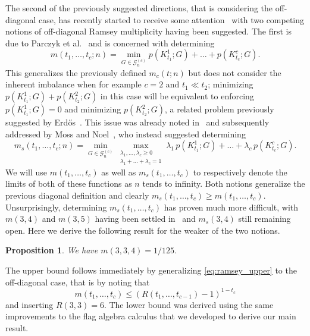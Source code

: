 \documentclass[a4paper,11pt]{article}
\newtheorem{proposition}[theorem]{Proposition}
\numberwithin{equation}{section}
\newcommand{\mG}{\mathcal{G}}
\begin{document}
The second of the previously suggested directions, that is considering the off-diagonal case, has recently started to receive some attention~\cite{ParczykEtAl_2022, behague2022common, moss2023off, Hyde2023} with two competing notions of off-diagonal Ramsey multiplicity having been suggested. The first is due to Parczyk et al.~\cite{ParczykEtAl_2022} and is concerned with determining 
%
\begin{equation*}
    m(t_1, \ldots, t_c; n) = \min_{G \in \mG_n^{(c)}} p(K_{t_1}^1; G) + \ldots + p(K_{t_c}^c; G).
\end{equation*}
%
This generalizes the previously defined $m_c(t; n)$ but does not consider the inherent imbalance when for example $c = 2$ and $t_1 \ll t_2$; minimizing $p(K_{t_1}^1; G) + p(K_{t_2}^2; G)$ in this case will be equivalent to enforcing $p(K_{t_1}^1; G) = 0$ and minimizing $p(K_{t_2}^2; G)$, a related problem previously suggested by Erd\H{o}s~\cite{Erdos_1962, nikiforov2001minimum, das2013problem, ParczykEtAl_2022}. This issue was already noted in~\cite{ParczykEtAl_2022} and subsequently addressed by Moss and Noel~\cite{moss2023off}, who instead suggested determining 
%
\begin{equation*}
    m_s(t_1, \ldots, t_c; n) = \min_{G \in \mG_n^{(c)}} \max_{\substack{\lambda_1, ..., \lambda_c \geq 0 \\ \lambda_1 + \ldots + \lambda_c = 1}} \lambda_1 \, p(K_{t_1}^1; G) + \ldots + \lambda_c \, p(K_{t_c}^c; G).
\end{equation*}
%
We will use $m(t_1, \ldots, t_c)$ as well as $m_s(t_1, \ldots, t_c)$ to respectively denote the limits of both of these functions as $n$ tends to infinity. Both notions generalize the previous diagonal definition and clearly $m_s(t_1, \ldots, t_c) \geq m(t_1, \ldots, t_c)$. Unsurprisingly, determining $m_s(t_1, \ldots, t_c)$ has proven much more difficult, with $m(3, 4)$ and $m(3, 5)$ having been settled in~\cite{ParczykEtAl_2022} and $m_s(3, 4)$ still remaining open. Here we derive the following result for the weaker of the two notions.
%
\begin{proposition} \label{prop:m334}
    We have $m(3, 3, 4) = 1/125$.
\end{proposition}

The upper bound follows immediately by generalizing \cref{eq:ramsey_upper} to the off-diagonal case, that is by noting that
%
\begin{equation} \label{eq:ramsey_upper_offdiag}
    m(t_1, \ldots, t_c) \leq (R(t_1, \ldots, t_{c-1}) - 1)^{1-t_c}
\end{equation}
%
and inserting $R(3, 3) = 6$. The lower bound was derived using the same improvements to the flag algebra calculus that we developed to derive our main result.
\end{document}
